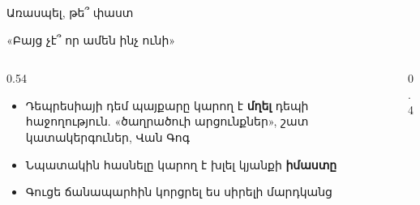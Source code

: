 \begin{frame}{Առասպել, թե՞ փաստ}
\end{frame}

\begin{frame}{«Բայց չէ՞ որ ամեն ինչ ունի»}
  \begin{columns}[c]
    \begin{column}{0.54\textwidth}
      \begin{itemize}
        \item Դեպրեսիայի դեմ պայքարը կարող է \textbf{մղել} դեպի հաջողություն. «ծաղրածուի արցունքներ», շատ կատակերգուներ, Վան Գոգ 
        \item<2-> Նպատակին հասնելը կարող է խլել կյանքի \textbf{իմաստը}
        \item<3-> Գուցե ճանապարհին կորցրել ես սիրելի մարդկանց
      \end{itemize}
    \end{column}
    \begin{column}{0.4\textwidth}
    \end{column}
  \end{columns}
\end{frame}

